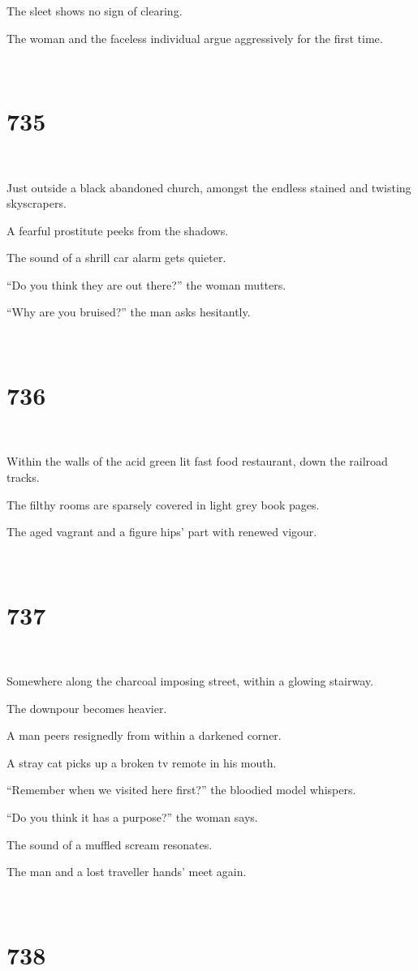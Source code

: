 \documentclass{report}
\begin{document}
The sleet shows no sign of clearing.

The woman and the faceless individual argue aggressively for the first time.

~
\chapter*{735}
~

Just outside a black abandoned church, amongst the endless stained and twisting skyscrapers.

A fearful prostitute peeks from the shadows.

The sound of a shrill car alarm gets quieter.

``Do you think they are out there?'' the woman mutters.

``Why are you bruised?'' the man asks hesitantly.

~
\chapter*{736}
~

Within the walls of the acid green lit fast food restaurant, down the railroad tracks.

The filthy rooms are sparsely covered in light grey book pages.

The aged vagrant and a figure hips' part with renewed vigour.

~
\chapter*{737}
~

Somewhere along the charcoal imposing street, within a glowing stairway.

The downpour becomes heavier.

A man peers resignedly from within a darkened corner.

A stray cat picks up a broken tv remote in his mouth.

``Remember when we visited here first?'' the bloodied model whispers.

``Do you think it has a purpose?'' the woman says.

The sound of a muffled scream resonates.

The man and a lost traveller hands' meet again.

~
\chapter*{738}
~
\end{document}
